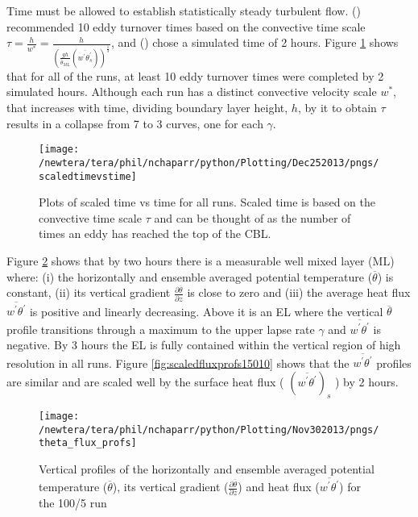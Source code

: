 Time must be allowed to establish statistically steady turbulent flow.  \citeauthor{SullMoengStev} 
(\citeyear{SullMoengStev}) recommended 10 eddy turnover times based on the convective time scale 
$\tau = \frac{h}{w^{*}} = \frac{h}{ \left( \frac{gh}{\overline{\theta}_{ML}}(\overline{w^{'} \theta^{'}_{s}}) \right)^{\frac{1}{3}} } $, 
and \citeauthor{BrooksFowler2} (\citeyear{BrooksFowler2}) chose a simulated time of 2 hours.  Figure \ref{fig:ScaledTimevsTime} shows that for all of 
the runs, at least 10 eddy turnover times were completed by 2 simulated hours.  
Although each run has a distinct convective velocity scale $w^{*}$, that increases with time, 
dividing boundary layer height, $h$, by it to obtain $\tau$ results in a collapse from 7 to 3 curves, 
one for each $\gamma$.\\

\begin{figure}[!h]
    \centering
    \texttt{[image: /newtera/tera/phil/nchaparr/python/Plotting/Dec252013/pngs/scaledtimevstime]}
    \caption[Scaled time vs Time]{Plots of scaled time vs time for all runs.  Scaled time is based on the convective time scale $\tau$ 
    and can be thought of as the number of times an eddy has reached the top of the CBL.}
    \label{fig:ScaledTimevsTime}   
\end{figure}

Figure \ref{fig:tempgradfluxprofs1005} shows that by two hours there is a measurable well mixed layer (\acs{ML}) where: (i) the horizontally and ensemble averaged potential temperature ($\overline{\theta}$) is constant, (ii) its vertical gradient $\frac{\partial \overline{\theta}}{\partial z}$ is close to zero and (iii) the average heat flux $\overline{w^{'}\theta^{'}}$ is positive and linearly decreasing. Above it is an \acs{EL} where the vertical $\overline{\theta}$ profile transitions through a maximum to the upper lapse rate $\gamma$ and $\overline{w^{'}\theta^{'}}$ is negative.  By 3 hours the \acs{EL} is fully contained within the vertical region of high resolution in all runs.  Figure \ref{fig:scaledfluxprofs15010} shows that the $\overline{w^{'}\theta^{'}}$ profiles are similar and are scaled well by the surface heat flux ( $(\overline{w^{'}\theta^{'}})_{s}$ ) by 2 hours.\\

\begin{figure}[htbp]
    \centering
    \texttt{[image: /newtera/tera/phil/nchaparr/python/Plotting/Nov302013/pngs/theta\_flux\_profs]}
    \caption[Vertical profiles of $\overline{\theta}$, $\frac{\partial \overline{\theta}}{\partial z}$ and $\overline{w^{'}\theta^{'}}$]{Vertical profiles of the horizontally and ensemble averaged potential temperature ($\overline{\theta}$), its vertical gradient ($\frac{\partial \overline{\theta}}{\partial z}$)  
     and heat flux ($\overline{w^{'}\theta^{'}}$) for the 100/5 run}
    \label{fig:tempgradfluxprofs1005}   %
\end{figure}

